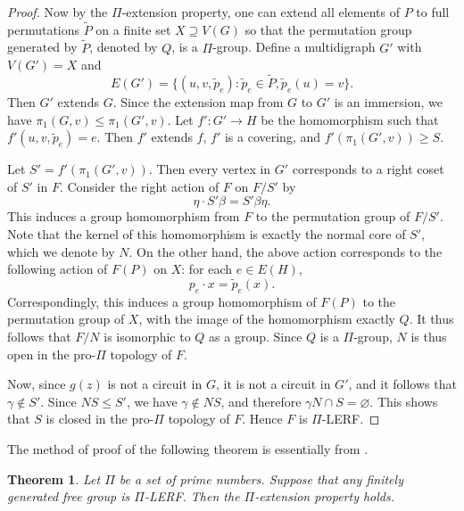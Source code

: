 \documentclass[11pt]{amsart}
\newtheorem{theorem}{Theorem}[section]
\theoremstyle{definition}
\theoremstyle{definition}
\numberwithin{equation}{section}
\begin{document}
\begin{proof}
Now by the $\Pi$-extension property, one can extend all elements of $P$ to full permutations $\tilde{P}$ on a finite set $X\supseteq V(G)$ so that the permutation group generated by $\tilde{P}$, denoted by $Q$, is a $\Pi$-group. Define a multidigraph $G'$ with $V(G')=X$ and
$$ E(G')=\{(u,v,\tilde{p}_e)\colon \tilde{p}_e\in \tilde{P}, \tilde{p}_e(u)=v\}. $$
Then $G'$ extends $G$. Since the extension map from $G$ to $G'$ is an immersion, we have $\pi_1(G, v)\leq \pi_1(G',v)$. Let $f'\colon G'\to H$ be the homomorphism such that $f'(u,v,\tilde{p}_e)=e$. Then $f'$ extends $f$, $f'$ is a covering, and $f'(\pi_1(G',v))\geq S$. 

Let $S'=f'(\pi_1(G', v))$. Then every vertex in $G'$ corresponds to a right coset of $S'$ in $F$. Consider the right action of $F$ on $F/S'$ by 
$$ \eta\cdot S'\beta=S'\beta\eta. $$
This induces a group homomorphism from $F$ to the permutation group of $F/S'$. Note that the kernel of this homomorphism is exactly the normal core of $S'$, which we denote by $N$. 
On the other hand, the above action corresponds to the following action of $F(P)$ on $X$: for each $e\in E(H)$, 
$$ p_e\cdot x=\tilde{p}_e(x). $$
Correspondingly, this induces a group homomorphism of $F(P)$ to the permutation group of $X$, with the image of the homomorphism exactly $Q$. It thus follows that $F/N$ is isomorphic to $Q$ as a group. Since $Q$ is a $\Pi$-group, $N$ is thus open in the pro-$\Pi$ topology of $F$. 

Now, since $g(z)$ is not a circuit in $G$, it is not a circuit in $G'$, and it follows that $\gamma\not\in S'$. Since $NS\leq S'$, we have $\gamma\not\in NS$, and therefore $\gamma N\cap S=\varnothing$. This shows that $S$ is closed in the pro-$\Pi$ topology of $F$. Hence $F$ is $\Pi$-LERF.
\end{proof}

The method of proof of the following theorem is essentially from \cite{HL00}.

\begin{theorem}\label{thm:LERF2EP} Let $\Pi$ be a set of prime numbers. Suppose that any finitely generated free group is $\Pi$-LERF. Then the $\Pi$-extension property holds.
\end{theorem}
\end{document}
